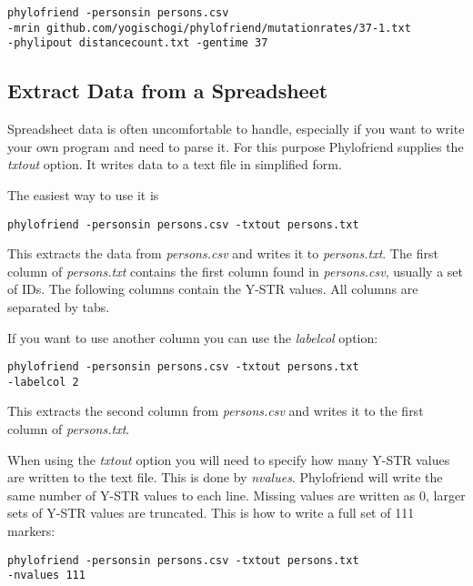 \noindent\texttt{phylofriend -personsin persons.csv\\
-mrin github.com/yogischogi/phylofriend/mutationrates/37-1.txt\\
-phylipout distancecount.txt -gentime 37}


\subsection{Extract Data from a Spreadsheet}

Spreadsheet data is often uncomfortable to handle, especially
if you want to write your own program and need to parse it.
For this purpose Phylofriend supplies the \emph{txtout}
option. It writes data to a text file in simplified form.

The easiest way to use it is

\noindent\texttt{phylofriend -personsin persons.csv -txtout persons.txt}

This extracts the data from \emph{persons.csv} and writes
it to \emph{persons.txt}. The first column of \emph{persons.txt}
contains the first column found in \emph{persons.csv}, usually
a set of IDs. The following columns contain the Y-STR values.
All columns are separated by tabs.

If you want to use another column you can use the
\emph{labelcol} option:

\noindent\texttt{phylofriend -personsin persons.csv -txtout persons.txt\\
-labelcol 2}

This extracts the second column from \emph{persons.csv} and
writes it to the first column of \emph{persons.txt}.

When using the \emph{txtout} option you will need to specify
how many Y-STR values are written to the text file. This is
done by \emph{nvalues}. Phylofriend will write the same number
of Y-STR values to each line. Missing values are written as
0, larger sets of Y-STR values are truncated. This is how to
write a full set of 111 markers:

\noindent\texttt{phylofriend -personsin persons.csv -txtout persons.txt\\
-nvalues 111}
















